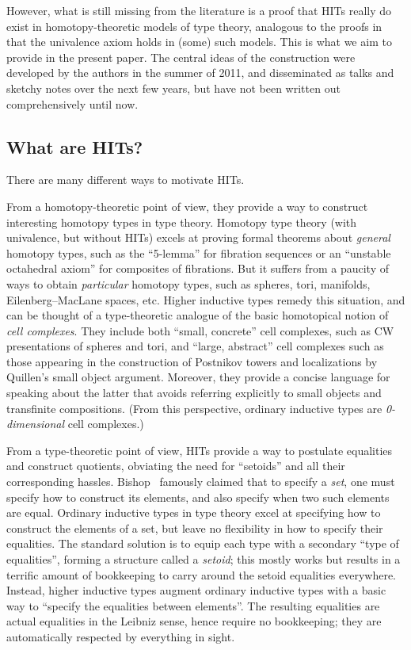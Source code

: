 \documentclass{amsart}
\begin{document}
However, what is still missing from the literature is a proof that HITs really do exist in homotopy-theoretic models of type theory, analogous to the proofs in~\cite{klv:ssetmodel,shulman:invdia,shulman:elreedy} that the univalence axiom holds in (some) such models.
This is what we aim to provide in the present paper.
The central ideas of the construction were developed by the authors in the summer of 2011, and disseminated as talks and sketchy notes over the next few years, but have not been written out comprehensively until now.

\subsection{What are HITs?}
\label{sec:what-are-hits}

There are many different ways to motivate HITs.

From a homotopy-theoretic point of view, they provide a way to construct interesting homotopy types in type theory.
Homotopy type theory (with univalence, but without HITs) excels at proving formal theorems about \emph{general} homotopy types, such as the ``5-lemma'' for fibration sequences or an ``unstable octahedral axiom'' for composites of fibrations.
But it suffers from a paucity of ways to obtain \emph{particular} homotopy types, such as spheres, tori, manifolds, Eilenberg--MacLane spaces, etc.
Higher inductive types remedy this situation, and can be thought of a type-theoretic analogue of the basic homotopical notion of \emph{cell complexes}.
They include both ``small, concrete'' cell complexes, such as CW presentations of spheres and tori, and ``large, abstract'' cell complexes such as those appearing in the construction of Postnikov towers and localizations by Quillen's small object argument.
Moreover, they provide a concise language for speaking about the latter that avoids referring explicitly to small objects and transfinite compositions.
(From this perspective, ordinary inductive types are \emph{0-dimensional} cell complexes.)

From a type-theoretic point of view, HITs provide a way to postulate equalities and construct quotients, obviating the need for ``setoids'' and all their corresponding hassles.
Bishop~\cite{bishop:fca} famously claimed that to specify a \emph{set}, one must specify how to construct its elements, and also specify when two such elements are equal.
Ordinary inductive types in type theory excel at specifying how to construct the elements of a set, but leave no flexibility in how to specify their equalities.
The standard solution is to equip each type with a secondary ``type of equalities'', forming a structure called a \emph{setoid}; this mostly works but results in a terrific amount of bookkeeping to carry around the setoid equalities everywhere.
Instead, higher inductive types augment ordinary inductive types with a basic way to ``specify the equalities between elements''.
The resulting equalities are actual equalities in the Leibniz sense, hence require no bookkeeping; they are automatically respected by everything in sight.
\end{document}

